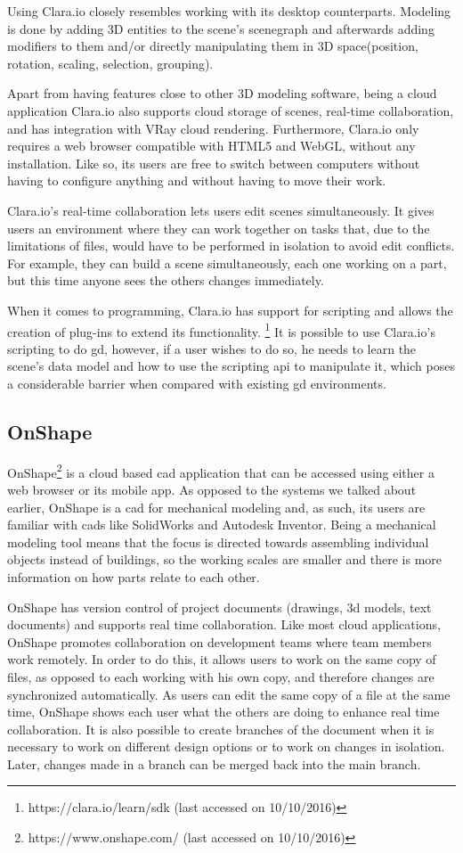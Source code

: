 Using Clara.io closely resembles working with its desktop counterparts.
Modeling is done by adding 3D entities to the scene's scenegraph and afterwards adding modifiers to them and/or directly manipulating them in 3D space(position, rotation, scaling, selection, grouping).

Apart from having features close to other 3D modeling software, being a cloud application Clara.io also supports cloud storage of scenes, real-time collaboration, and has integration with VRay cloud rendering.
Furthermore, Clara.io only requires a web browser compatible with HTML5 and WebGL, without any installation.
Like so, its users are free to switch between computers without having to configure anything and without having to move their work.

Clara.io's real-time collaboration lets users edit scenes simultaneously.
It gives users an environment where they can work together on tasks that, due to the limitations of files, would have to be performed in isolation to avoid edit conflicts.
For example, they can build a scene simultaneously, each one working on a part, but this time anyone sees the others changes immediately.

When it comes to programming, Clara.io has support for scripting and allows the creation of plug-ins to extend its functionality.%
\footnote{https://clara.io/learn/sdk (last accessed on 10/10/2016)}
It is possible to use Clara.io's scripting to do \gls{gd}, however, if a user wishes to do so, he needs to learn the scene's data model and how to use the scripting \gls{api} to manipulate it, which poses a considerable barrier when compared with existing \gls{gd} environments.


\subsection{OnShape}
OnShape\footnote{https://www.onshape.com/ (last accessed on 10/10/2016)} is a cloud based \gls{cad} application that can be accessed using either a web browser or its mobile app.
As opposed to the systems we talked about earlier, OnShape is a \gls{cad} for mechanical modeling and, as such, its users are familiar with \glspl{cad} like SolidWorks and Autodesk Inventor.
Being a mechanical modeling tool means that the focus is directed towards assembling individual objects instead of buildings, so the working scales are smaller and there is more information on how parts relate to each other.

OnShape has version control of project documents (drawings, 3d models, text documents) and supports real time collaboration.
Like most cloud applications, OnShape promotes collaboration on development teams where team members work remotely.
In order to do this, it allows users to work on the same copy of files, as opposed to each working with his own copy, and therefore changes are synchronized automatically.
As users can edit the same copy of a file at the same time, OnShape shows each user what the others are doing to enhance real time collaboration.
It is also possible to create branches of the document when it is necessary to work on different design options or to work on changes in isolation.
Later, changes made in a branch can be merged back into the main branch.

